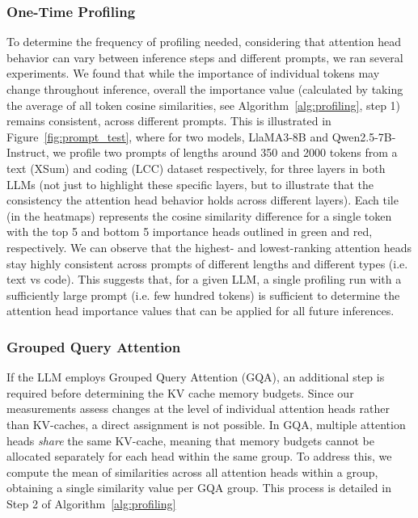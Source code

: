 \subsubsection{One-Time Profiling}
To determine the frequency of profiling needed, considering that attention head behavior can vary between inference steps and different prompts, 
we ran several experiments. We found that while the importance of individual tokens may change throughout inference, overall the importance value (calculated by taking the average of all token cosine similarities, see Algorithm~\ref{alg:profiling}, step 1) remains consistent, across different prompts. This is illustrated in Figure~\ref{fig:prompt_test}, where for two models, LlaMA3-8B and Qwen2.5-7B-Instruct, we profile two prompts of lengths around 350 and 2000 tokens from a text (XSum) and coding (LCC) dataset respectively, for three layers in both LLMs (not just to highlight these specific layers, but to illustrate that the consistency the attention head behavior holds across different layers). Each tile (in the heatmaps) represents the cosine similarity difference for a single token with the top 5 and bottom 5 importance heads outlined in green and red,  respectively. We can observe that the highest- and lowest-ranking attention heads stay highly consistent across prompts of different lengths and different types (i.e. text vs code). This suggests that, for a given LLM, a single profiling run with a sufficiently large prompt (i.e. few hundred tokens) is sufficient to determine the attention head importance values that can be applied for all future inferences.

\subsubsection{Grouped Query Attention} 
If the LLM employs Grouped Query Attention (GQA), an additional step is required before determining the KV cache memory budgets. Since our measurements assess changes at the level of individual attention heads rather than KV-caches, a direct assignment is not possible. In GQA, multiple attention heads \textit{share} the same KV-cache, meaning that memory budgets cannot be allocated separately for each head within the same group. To address this, we compute the mean of similarities across all attention heads within a group, obtaining a single similarity value per GQA group. This process is detailed in Step 2 of Algorithm~\ref{alg:profiling}



